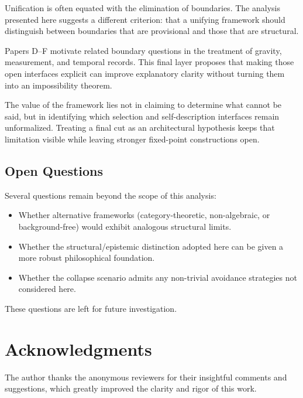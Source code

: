 \documentclass[12pt,a4paper]{article}
\begin{document}
Unification is often equated with the elimination of boundaries. The analysis presented here suggests a different criterion: that a unifying framework should distinguish between boundaries that are provisional and those that are structural.

Papers D--F motivate related boundary questions in the treatment of gravity, measurement, and temporal records. This final layer proposes that making those open interfaces explicit can improve explanatory clarity without turning them into an impossibility theorem.

The value of the framework lies not in claiming to determine what cannot be said, but in identifying which selection and self-description interfaces remain unformalized. Treating a final cut as an architectural hypothesis keeps that limitation visible while leaving stronger fixed-point constructions open.

\subsection{Open Questions}

Several questions remain beyond the scope of this analysis:

\begin{itemize}
    \item Whether alternative frameworks (category-theoretic, non-algebraic, or background-free) would exhibit analogous structural limits.
    \item Whether the structural/epistemic distinction adopted here can be given a more robust philosophical foundation.
    \item Whether the collapse scenario admits any non-trivial avoidance strategies not considered here.
\end{itemize}

These questions are left for future investigation.

\section*{Acknowledgments}

The author thanks the anonymous reviewers for their insightful comments and suggestions, which greatly improved the clarity and rigor of this work.
\end{document}
